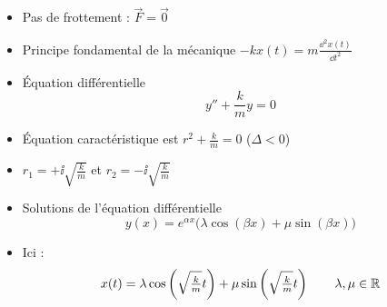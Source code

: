 \begin{frame}

\vspace*{3ex}


\vspace*{-3ex}

\hspace*{-1em}
\begin{minipage}{0.59\textwidth}
\begin{itemize}
  
  
  
  
\end{itemize}
\end{minipage}
\begin{minipage}{0.40\textwidth}
\end{minipage}


  
 \end{frame}


\begin{frame} 


\pause
\begin{itemize}[<+->]
  \item Pas de frottement : $\vec F = \vec 0$
  
  \item Principe fondamental de la mécanique $-kx(t) = m\frac{\dd^2 x(t)}{\dd t^2}$
  
  \item \'Equation différentielle 
  $$y'' + \frac{k}{m} y = 0$$
  
  \item \'Equation caractéristique est $r^2+\frac{k}{m} = 0$ \quad ($\Delta <0$)
  
  \item $r_1 = +\ii\sqrt{\frac{k}{m}}$ et $r_2 = -\ii\sqrt{\frac{k}{m}}$
  
  \item Solutions de l'équation différentielle
  $$y(x) = e^{\alpha x}\big(\lambda\cos (\beta x)+\mu\sin (\beta x)\big)$$

  \item Ici : 
  $$x(t) = \lambda\cos \left(\sqrt{\tfrac{k}{m}}t\right)
+\mu\sin \left(\sqrt{\tfrac{k}{m}}t\right)
\qquad \lambda, \mu \in \mathbb{R}$$
\end{itemize}

\end{frame}


